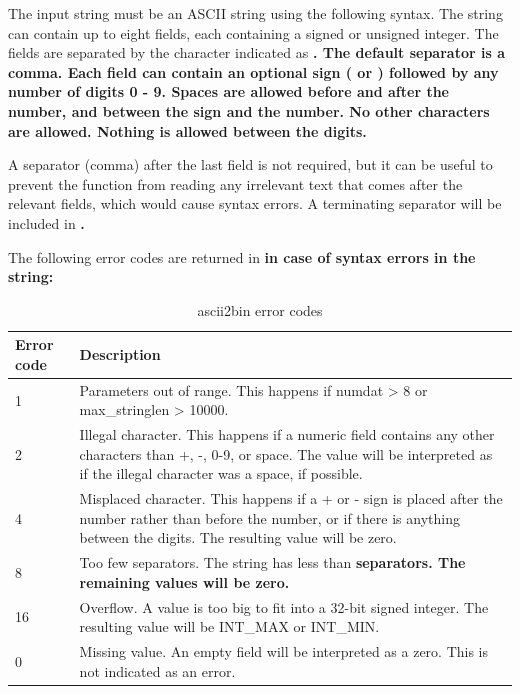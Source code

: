 \documentclass[11pt,a4paper,oneside,openright]{report}
\newcommand{\vspacesmall}{\vspace{3mm}}
\newcommand{\codei}[1]{\bfseries \ttfamily{#1}\normalfont}
\begin{document}
The input string must be an ASCII string using the following syntax.
The string can contain up to eight fields, each containing a signed or unsigned integer. The fields are separated by the character indicated as \codei{separator}. The default separator is a comma. Each field can contain an optional sign (\codei{+} or \codei{-}) followed by any number of digits 0 - 9. Spaces are allowed before and after the number, and between the sign and the number. No other characters are allowed. Nothing is allowed between the digits.
\vspacesmall

A separator (comma) after the last field is not required, but it can be useful to prevent the function from reading any irrelevant text that comes after the relevant fields, which would cause syntax errors. A terminating separator will be included in \codei{chars\_read}.
\vspacesmall

The following error codes are returned in \codei{*error} in case of syntax errors in the string:

\begin {table}[H]
\caption{ascii2bin error codes}
\label{table:ascii2binErrorCodes}
\begin{tabular}{|p{24mm}|p{130mm}|}
\hline
\bfseries Error code & \bfseries Description \\ \hline
1 & Parameters out of range. This happens if numdat \textgreater{} 8 or max\_stringlen \textgreater{} 10000.  \\ \hline
2 & Illegal character. This happens if a numeric field contains any other characters than +, -, 0-9, or space. The value will be interpreted as if the illegal character was a space, if possible. \\ \hline
4 & Misplaced character. This happens if a + or - sign is placed after the number rather than before the number, or if there is anything between the digits. \newline The resulting value will be zero. \\ \hline
8 & Too few separators. The string has less than \codei{numdat-1} separators. The remaining values will be zero. \\ \hline
16 & Overflow. A value is too big to fit into a 32-bit signed integer. The resulting value will be INT\_MAX or INT\_MIN. \\ \hline
0 & Missing value. An empty field will be interpreted as a zero. This is not indicated as an error. \\ \hline
\end{tabular}
\end{table}
\end{document}
